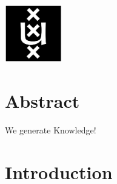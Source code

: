 \documentclass{article}
\newcommand{\red}[1]{{\color{red}{#1}}}
\begin{document}
\begin{titlepage}
\begin{minipage}[t]{0.4\textwidth}
\begin{flushright}
\end{flushright}

\end{minipage}\\[2cm]









\includegraphics[width=2.5cm]{data/images/uva.png}\\ %


 




\vfill %



\end{titlepage}

\tableofcontents
\newpage

\section*{Abstract}
We generate Knowledge! \cite{kipf_contrastive_2020}

% 

\section{Introduction}

\end{document}
